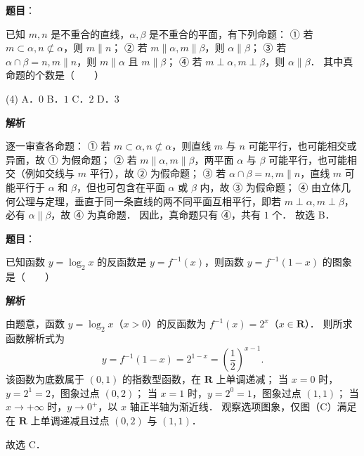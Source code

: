 \begin{answer}

\textbf{题目}：

已知 $m, n$ 是不重合的直线，$\alpha, \beta$ 是不重合的平面，有下列命题：
① 若 $m \subset \alpha, n \not\subset \alpha$，则 $m \parallel n$；
② 若 $m \parallel \alpha, m \parallel \beta$，则 $\alpha \parallel \beta$；
③ 若 $\alpha \cap \beta = n, m \parallel n$，则 $m \parallel \alpha$ 且 $m \parallel \beta$；
④ 若 $m \perp \alpha, m \perp \beta$，则 $\alpha \parallel \beta$．
其中真命题的个数是\mbox{（　　）}

\begin{gkopts}(4)
\task A．$0$
\task B．$1$
\task C．$2$
\task D．$3$
\end{gkopts}

\textbf{解析}

逐一审查各命题：
① 若 $m \subset \alpha, n \not\subset \alpha$，则直线 $m$ 与 $n$ 可能平行，也可能相交或异面，故 ① 为假命题；
② 若 $m \parallel \alpha, m \parallel \beta$，两平面 $\alpha$ 与 $\beta$ 可能平行，也可能相交（例如交线与 $m$ 平行），故 ② 为假命题；
③ 若 $\alpha \cap \beta = n, m \parallel n$，直线 $m$ 可能平行于 $\alpha$ 和 $\beta$，但也可包含在平面 $\alpha$ 或 $\beta$ 内，故 ③ 为假命题；
④ 由立体几何公理与定理，垂直于同一条直线的两不同平面互相平行，即若 $m \perp \alpha, m \perp \beta$，必有 $\alpha \parallel \beta$，故 ④ 为真命题．
因此，真命题只有 ④，共有 $1$ 个．
故选 B．


\end{answer}
\begin{answer}

\textbf{题目}：

已知函数 $y = \log_2 x$ 的反函数是 $y = f^{-1}(x)$，则函数 $y = f^{-1}(1 - x)$ 的图象是\mbox{（　　）}
\nopagebreak[4]
\begin{center}\end{center}
\nopagebreak[4]
\textbf{解析}

由题意，函数 $y = \log_2 x$（$x > 0$）的反函数为 $f^{-1}(x) = 2^x$（$x \in \mathbf{R}$）．
则所求函数解析式为
\nopagebreak[4]
\[
y = f^{-1}(1 - x) = 2^{1 - x} = \left(\frac{1}{2}\right)^{x - 1}.
\]
该函数为底数属于 $(0, 1)$ 的指数型函数，在 $\mathbf{R}$ 上单调递减；
当 $x = 0$ 时，$y = 2^1 = 2$，图象过点 $(0, 2)$；
当 $x = 1$ 时，$y = 2^0 = 1$，图象过点 $(1, 1)$；
当 $x \to +\infty$ 时，$y \to 0^+$，以 $x$ 轴正半轴为渐近线．
观察选项图象，仅图（C）满足在 $\mathbf{R}$ 上单调递减且过点 $(0, 2)$ 与 $(1, 1)$．
\nopagebreak[4]
\begin{center}\end{center}
\nopagebreak[4]
故选 C．


\end{answer}
